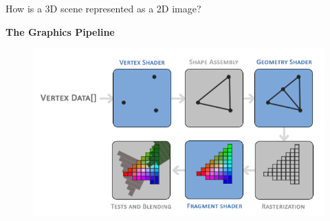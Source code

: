 \documentclass[10pt]{beamer}
\begin{document}
\begin{frame}{How is a 3D scene represented as a 2D image?}
  \begin{center}
    \huge\textbf{The Graphics Pipeline}
  \end{center}
  \begin{figure}
    \includegraphics[width=\textwidth]{learnopengl_graphicspipeline.png}
  \end{figure}
\end{frame}
\end{document}
